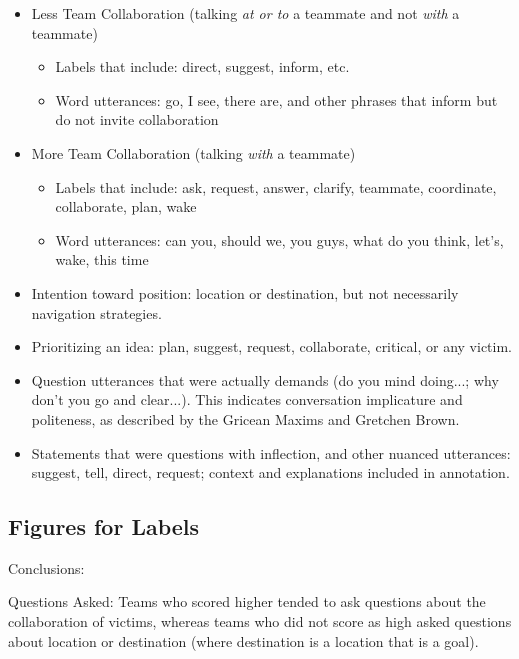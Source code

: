 \begin{itemize}
    \item Less Team Collaboration (talking \emph{at or to} a teammate and not \emph{with} a teammate)
    \begin{itemize}
    	\item Labels that include: direct, suggest, inform, etc.
	\item Word utterances: go, I see, there are, and other phrases that inform but do not invite collaboration
    \end{itemize}
    \item More Team Collaboration (talking \emph{with} a teammate)
    \begin{itemize}
        \item Labels that include: ask, request, answer, clarify, teammate, coordinate, collaborate, plan, wake
        \item Word utterances: can you, should we, you guys, what do you think, let's, wake, this time
    \end{itemize}
    \item Intention toward position: location or destination, but not necessarily navigation strategies.
    \item Prioritizing an idea: plan, suggest, request, collaborate, critical, or any victim.
    \item Question utterances that were actually demands (do you mind doing...; why don't you go and clear...). This indicates conversation implicature and politeness, as described by the Gricean Maxims and Gretchen Brown.
    \item Statements that were questions with inflection, and other nuanced utterances: suggest, tell, direct, request; context and explanations included in annotation.
\end{itemize}










\newpage
\subsection{Figures for Labels}
Conclusions:

Questions Asked: Teams who scored higher tended to ask questions about the collaboration of victims, whereas teams who did not score as high asked questions about location or destination (where destination is a location that is a goal).






